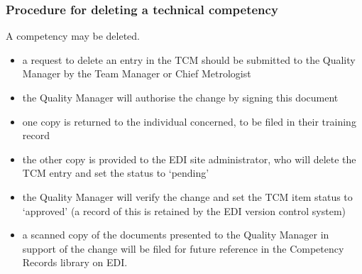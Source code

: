 \subsubsection{Procedure for deleting a technical competency}
A competency may be deleted.
\begin{itemize}
\item a request to delete an entry in the TCM should be submitted to the Quality Manager by the Team Manager or Chief Metrologist

\item the Quality Manager will authorise the change by signing this document

\item one copy is returned to the individual concerned, to be filed in their training record

\item the other copy is provided to the EDI site administrator, who will delete the TCM entry and set the status to ‘pending' 

\item the Quality Manager will verify the change and set the TCM item status to ‘approved' (a record of this is retained by the EDI version control system)

\item a scanned copy of the documents presented to the Quality Manager in support of the change will be filed for future reference in the Competency Records library on EDI.
\end{itemize}
